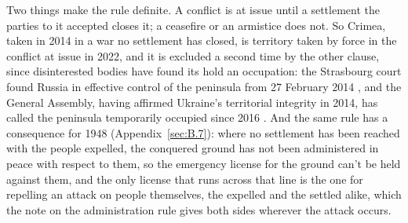 Two things make the rule definite. A conflict is at issue until a settlement the parties to it accepted closes it; a ceasefire or an armistice does not. So Crimea, taken in 2014 in a war no settlement has closed, is territory taken by force in the conflict at issue in 2022, and it is excluded a second time by the other clause, since disinterested bodies have found its hold an occupation: the Strasbourg court found Russia in effective control of the peninsula from 27 February 2014 \autocite{ecthr2024crimea}, and the General Assembly, having affirmed Ukraine's territorial integrity in 2014, has called the peninsula temporarily occupied since 2016 \autocite{unga2014res68262,unga2016res71205}. And the same rule has a consequence for 1948 (Appendix~\ref{sec:B.7}): where no settlement has been reached with the people expelled, the conquered ground has not been administered in peace with respect to them, so the emergency license for the ground can't be held against them, and the only license that runs across that line is the one for repelling an attack on people themselves, the expelled and the settled alike, which the note on the administration rule gives both sides wherever the attack occurs.
